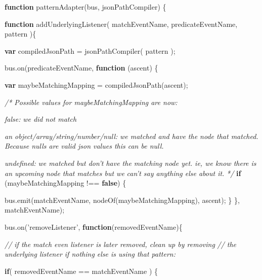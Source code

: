 \documentclass[12pt, ]{article}
\newenvironment{Shaded}{}{}
\newcommand{\KeywordTok}[1]{\textcolor[rgb]{0.00,0.44,0.13}{\textbf{{#1}}}}
\newcommand{\StringTok}[1]{\textcolor[rgb]{0.25,0.44,0.63}{{#1}}}
\newcommand{\CommentTok}[1]{\textcolor[rgb]{0.38,0.63,0.69}{\textit{{#1}}}}
\newcommand{\OtherTok}[1]{\textcolor[rgb]{0.00,0.44,0.13}{{#1}}}
\newcommand{\FunctionTok}[1]{\textcolor[rgb]{0.02,0.16,0.49}{{#1}}}
\newcommand{\NormalTok}[1]{{#1}}
\begin{document}
\begin{Shaded}
\begin{Highlighting}[]
\KeywordTok{function} \FunctionTok{patternAdapter}\NormalTok{(bus, jsonPathCompiler) \{}

   \KeywordTok{function} \FunctionTok{addUnderlyingListener}\NormalTok{( matchEventName, predicateEventName, pattern )\{}

      \KeywordTok{var} \NormalTok{compiledJsonPath = }\FunctionTok{jsonPathCompiler}\NormalTok{( pattern );}
   
      \OtherTok{bus}\NormalTok{.}\FunctionTok{on}\NormalTok{(predicateEventName, }\KeywordTok{function} \NormalTok{(ascent) \{}

         \KeywordTok{var} \NormalTok{maybeMatchingMapping = }\FunctionTok{compiledJsonPath}\NormalTok{(ascent);}

         \CommentTok{/* Possible values for maybeMatchingMapping are now:}

\CommentTok{          false: }
\CommentTok{          we did not match }

\CommentTok{          an object/array/string/number/null: }
\CommentTok{          we matched and have the node that matched.}
\CommentTok{          Because nulls are valid json values this can be null.}

\CommentTok{          undefined:}
\CommentTok{          we matched but don't have the matching node yet.}
\CommentTok{          ie, we know there is an upcoming node that matches but we }
\CommentTok{          can't say anything else about it. }
\CommentTok{          */}
         \KeywordTok{if} \NormalTok{(maybeMatchingMapping !== }\KeywordTok{false}\NormalTok{) \{}
             
            \OtherTok{bus}\NormalTok{.}\FunctionTok{emit}\NormalTok{(matchEventName, }\FunctionTok{nodeOf}\NormalTok{(maybeMatchingMapping), ascent);}
         \NormalTok{\}}
      \NormalTok{\}, matchEventName);}
   
   
      \OtherTok{bus}\NormalTok{.}\FunctionTok{on}\NormalTok{(}\StringTok{'removeListener'}\NormalTok{, }\KeywordTok{function}\NormalTok{(removedEventName)\{}
   
         \CommentTok{// if the match even listener is later removed, clean up by removing}
         \CommentTok{// the underlying listener if nothing else is using that pattern:}
      
         \KeywordTok{if}\NormalTok{( removedEventName == matchEventName ) \{}
         

\end{Highlighting}
\end{Shaded}
\end{document}
